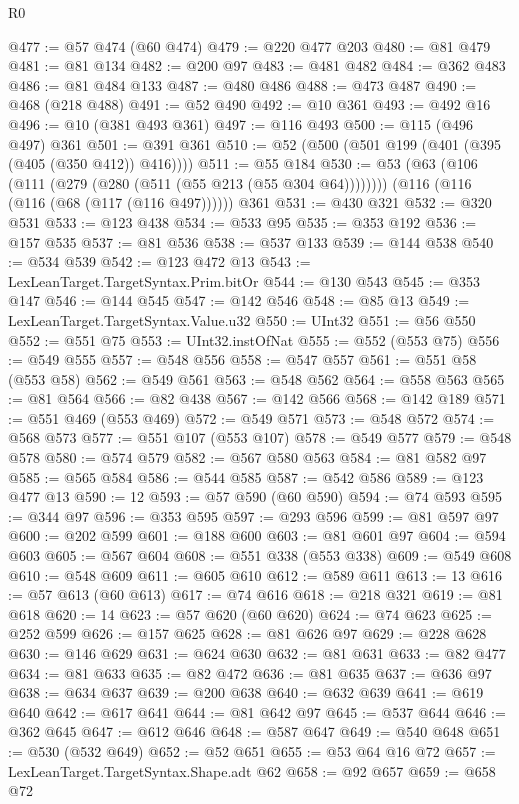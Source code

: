 \begin{lexlean}{R0}
\begin{coremodule}
@477 := @57 @474 (@60 @474)
@479 := @220 @477 @203
@480 := @81 @479
@481 := @81 @134
@482 := @200 @97
@483 := @481 @482
@484 := @362 @483
@486 := @81 @484 @133
@487 := @480 @486
@488 := @473 @487
@490 := @468 (@218 @488)
@491 := @52 @490
@492 := @10 @361
@493 := @492 @16
@496 := @10 (@381 @493 @361)
@497 := @116 @493
@500 := @115 (@496 @497) @361
@501 := @391 @361
@510 := @52 (@500 (@501 @199 (@401 (@395 (@405 (@350 @412)) @416))))
@511 := @55 @184
@530 := @53
    (@63 (@106 (@111 (@279 (@280 (@511 (@55 @213 (@55 @304 @64))))))))
    (@116 (@116 (@116 (@68 (@117 (@116 @497))))))
    @361
@531 := @430 @321
@532 := @320 @531
@533 := @123 @438
@534 := @533 @95
@535 := @353 @192
@536 := @157 @535
@537 := @81 @536
@538 := @537 @133
@539 := @144 @538
@540 := @534 @539
@542 := @123 @472 @13
@543 := LexLeanTarget.TargetSyntax.Prim.bitOr
@544 := @130 @543
@545 := @353 @147
@546 := @144 @545
@547 := @142 @546
@548 := @85 @13
@549 := LexLeanTarget.TargetSyntax.Value.u32
@550 := UInt32
@551 := @56 @550
@552 := @551 @75
@553 := UInt32.instOfNat
@555 := @552 (@553 @75)
@556 := @549 @555
@557 := @548 @556
@558 := @547 @557
@561 := @551 @58 (@553 @58)
@562 := @549 @561
@563 := @548 @562
@564 := @558 @563
@565 := @81 @564
@566 := @82 @438
@567 := @142 @566
@568 := @142 @189
@571 := @551 @469 (@553 @469)
@572 := @549 @571
@573 := @548 @572
@574 := @568 @573
@577 := @551 @107 (@553 @107)
@578 := @549 @577
@579 := @548 @578
@580 := @574 @579
@582 := @567 @580 @563
@584 := @81 @582 @97
@585 := @565 @584
@586 := @544 @585
@587 := @542 @586
@589 := @123 @477 @13
@590 := 12
@593 := @57 @590 (@60 @590)
@594 := @74 @593
@595 := @344 @97
@596 := @353 @595
@597 := @293 @596
@599 := @81 @597 @97
@600 := @202 @599
@601 := @188 @600
@603 := @81 @601 @97
@604 := @594 @603
@605 := @567 @604
@608 := @551 @338 (@553 @338)
@609 := @549 @608
@610 := @548 @609
@611 := @605 @610
@612 := @589 @611
@613 := 13
@616 := @57 @613 (@60 @613)
@617 := @74 @616
@618 := @218 @321
@619 := @81 @618
@620 := 14
@623 := @57 @620 (@60 @620)
@624 := @74 @623
@625 := @252 @599
@626 := @157 @625
@628 := @81 @626 @97
@629 := @228 @628
@630 := @146 @629
@631 := @624 @630
@632 := @81 @631
@633 := @82 @477
@634 := @81 @633
@635 := @82 @472
@636 := @81 @635
@637 := @636 @97
@638 := @634 @637
@639 := @200 @638
@640 := @632 @639
@641 := @619 @640
@642 := @617 @641
@644 := @81 @642 @97
@645 := @537 @644
@646 := @362 @645
@647 := @612 @646
@648 := @587 @647
@649 := @540 @648
@651 := @530 (@532 @649)
@652 := @52 @651
@655 := @53 @64 @16 @72
@657 := LexLeanTarget.TargetSyntax.Shape.adt @62
@658 := @92 @657
@659 := @658 @72

\end{coremodule}
\end{lexlean}
